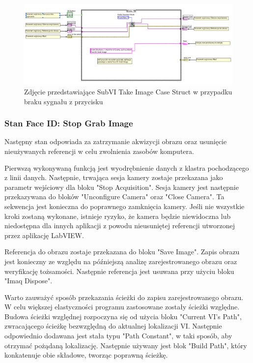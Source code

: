 \documentclass{report}
\begin{document}
\begin{figure}[H]
    \centering
    \includegraphics[width=1.0\textwidth]{src/face-id/face-id-case-2.png}
    \caption{Zdjęcie przedstawiające SubVI Take Image Case Struct w przypadku braku sygnału z przycisku}
    \label{fig:face_id-grab-case-2}
\end{figure}

\subsubsection{\large Stan Face ID: Stop Grab Image}

Następny stan odpowiada za zatrzymanie akwizycji obrazu oraz usunięcie nieużywanych referencji w celu zwolnienia zasobów komputera.

Pierwszą wykonywaną funkcją jest wyodrębnienie danych z klastra pochodzącego z linii danych. Następnie, trwająca sesja kamery zostaje przekazana jako parametr wejściowy dla bloku "Stop Acquisition". Sesja kamery jest następnie przekazywana do bloków "Unconfigure Camera" oraz "Close Camera". Ta sekwencja jest konieczna do poprawnego zamknięcia kamery. Jeśli nie wszystkie kroki zostaną wykonane, istnieje ryzyko, że kamera będzie niewidoczna lub niedostępna dla innych aplikacji z powodu nieusuniętej referencji utworzonej przez aplikację LabVIEW.

Referencja do obrazu zostaje przekazana do bloku "Save Image". Zapis obrazu jest konieczny ze względu na późniejszą analizę zarejestrowanego obrazu oraz weryfikację tożsamości. Następnie referencja jest usuwana przy użyciu bloku "Imaq Dispose".

Warto zauważyć sposób przekazania ścieżki do zapisu zarejestrowanego obrazu. W celu większej elastyczności programu zastosowane zostały ścieżki względne. Budowa ścieżki względnej rozpoczyna się od użycia bloku "Current VI's Path", zwracającego ścieżkę bezwzględną do aktualnej lokalizacji VI. Następnie odpowiednio dodawana jest stała typu "Path Constant", w taki sposób, aby otrzymać pożądaną lokalizację. Następnie używany jest blok "Build Path", który konkatenuje obie składowe, tworząc poprawną ścieżkę.
\end{document}
